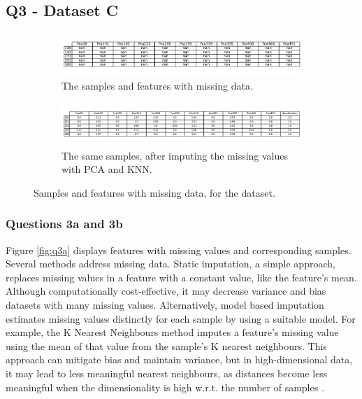 
\subsection{Q3 - Dataset C}\label{subsec:dataset-c}
    \begin{figure}
    \centering
    \begin{subfigure}{0.9\textwidth}
        \centering
        \includegraphics[width=1\textwidth]{./figures/q3a}
        \caption{The samples and features with missing data.}
        \label{fig:q3a}
    \end{subfigure}%
    \hfill
    \begin{subfigure}{0.9\textwidth}
        \centering
        \includegraphics[width=1\textwidth]{./figures/q3c_1}
        \caption{The same samples, after imputing the missing values with PCA and KNN.}
        \label{fig:q3c}
    \end{subfigure}
    \caption{Samples and features with missing data, for the  dataset.}
    \label{fig:q3ac}
    \end{figure}

\subsubsection{Questions 3a and 3b}\label{subsubsec:q3ab}
    Figure \eqref{fig:q3a} displays features with missing values and corresponding samples.
    Several methods address missing data.
    Static imputation, a simple approach, replaces missing values in a feature with a constant value, like the feature's mean.
    Although computationally cost-effective, it may decrease variance and bias datasets with many missing values.
    Alternatively, model based imputation estimates missing values distinctly for each sample by using a suitable model.
    For example, the K Nearest Neighbours method imputes a feature's missing value using the mean of that value from
    the sample's K nearest neighbours.
    This approach can mitigate bias and maintain variance, but in high-dimensional data, it may lead to less meaningful
    nearest neighbours, as distances become less meaningful when the dimensionality is high w.r.t. the number of
    samples \cite{bellman1957}.

